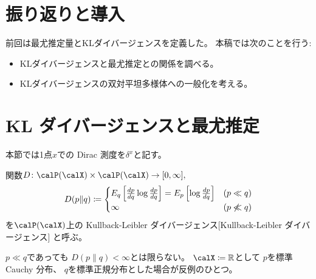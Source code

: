 \documentclass[report]{jlreq}
\begin{document}
%

%
\section*{振り返りと導入}

前回は最尤推定量とKLダイバージェンスを定義した。
本稿では次のことを行う:
\begin{itemize}
    \item KLダイバージェンスと最尤推定との関係を調べる。
    \item KLダイバージェンスの双対平坦多様体への一般化を考える。
\end{itemize}

%
\section{KL ダイバージェンスと最尤推定}

本節では1点$x$での Dirac 測度を$\delta^x$と記す。

\begin{definition}
    関数$D \colon \calP(\calX) \times \calP(\calX) \to [0, \infty],$
    \begin{equation}
        D(p \| q)
            \coloneqq
                \begin{cases}
                    E_q \left[{
                        \frac{dp}{dq}
                        \log \frac{dp}{dq}
                    }\right]
                        =
                            E_p \left[{
                                \log \frac{dp}{dq}
                            }\right]
                        & (p \ll q) \\
                    \infty
                        & (p \not\ll q)
                \end{cases}
    \end{equation}
    を$\calP(\calX)$上の
        {Kullback-Leibler ダイバージェンス}[Kullback-Leibler ダイバージェンス]
    と呼ぶ。
\end{definition}

\begin{example}[有限でない例]
    $p \ll q$であっても
    $D(p \| q) < \infty$とは限らない。
    $\calX \coloneqq \R$として
    $p$を標準 Cauchy 分布、
    $q$を標準正規分布とした場合が反例のひとつ。
\end{example}
\end{document}
